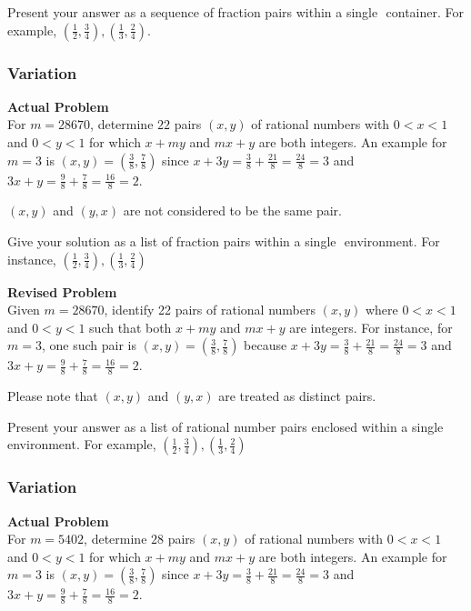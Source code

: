 Present your answer as a sequence of fraction pairs within a single $\boxed{}$ container. For example, $\boxed{(\frac{1}{2}, \frac{3}{4}), (\frac{1}{3}, \frac{2}{4})}$.

\subsubsection{Variation}
\textbf{Actual Problem}\\
For $m = 28670$, determine $22$ pairs $(x,y)$ of rational numbers with $0 < x < 1$ and $0 < y < 1$ for which $x+my$ and $mx+y$ are both integers. An example for $m = 3$ is $(x, y) = \left(\frac{3}{8},\frac{7}{8}\right)$ since $x+3y=\frac{3}{8} + \frac{21}{8} = \frac{24}{8} = 3$ and $3x+y=\frac{9}{8} + \frac{7}{8} = \frac{16}{8} = 2$.

$(x,y)$ and $(y,x)$ are not considered to be the same pair.

Give your solution as a list of fraction pairs within a single $\boxed{}$ environment. For instance, $\boxed{(\frac{1}{2},\frac{3}{4}),(\frac{1}{3},\frac{2}{4})}$

\textbf{Revised Problem}\\
Given \(m = 28670\), identify 22 pairs of rational numbers \((x, y)\) where \(0 < x < 1\) and \(0 < y < 1\) such that both \(x + my\) and \(mx + y\) are integers. For instance, for \(m = 3\), one such pair is \((x, y) = \left(\frac{3}{8}, \frac{7}{8}\right)\) because \(x + 3y = \frac{3}{8} + \frac{21}{8} = \frac{24}{8} = 3\) and \(3x + y = \frac{9}{8} + \frac{7}{8} = \frac{16}{8} = 2\).

Please note that \((x, y)\) and \((y, x)\) are treated as distinct pairs.

Present your answer as a list of rational number pairs enclosed within a single \(\boxed{}\) environment. For example, \(\boxed{(\frac{1}{2}, \frac{3}{4}), (\frac{1}{3}, \frac{2}{4})}\)

\subsubsection{Variation}
\textbf{Actual Problem}\\
For $m = 5402$, determine $28$ pairs $(x,y)$ of rational numbers with $0 < x < 1$ and $0 < y < 1$ for which $x+my$ and $mx+y$ are both integers. An example for $m = 3$ is $(x, y) = \left(\frac{3}{8},\frac{7}{8}\right)$ since $x+3y=\frac{3}{8} + \frac{21}{8} = \frac{24}{8} = 3$ and $3x+y=\frac{9}{8} + \frac{7}{8} = \frac{16}{8} = 2$.

